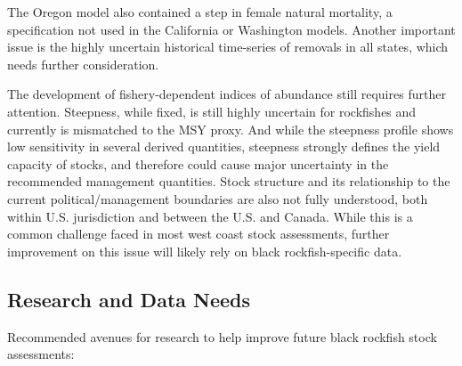 \documentclass[12pt,]{article}
\begin{document}
The Oregon model also contained a step in female natural mortality, a
specification not used in the California or Washington models. Another
important issue is the highly uncertain historical time-series of
removals in all states, which needs further consideration.

The development of fishery-dependent indices of abundance still requires
further attention. Steepness, while fixed, is still highly uncertain for
rockfishes and currently is mismatched to the MSY proxy. And while the
steepness profile shows low sensitivity in several derived quantities,
steepness strongly defines the yield capacity of stocks, and therefore
could cause major uncertainty in the recommended management quantities.
Stock structure and its relationship to the current political/management
boundaries are also not fully understood, both within U.S. jurisdiction
and between the U.S. and Canada. While this is a common challenge faced
in most west coast stock assessments, further improvement on this issue
will likely rely on black rockfish-specific data.

\subsection*{Research and Data Needs}\label{research-and-data-needs}

Recommended avenues for research to help improve future black rockfish
stock assessments:
\end{document}
